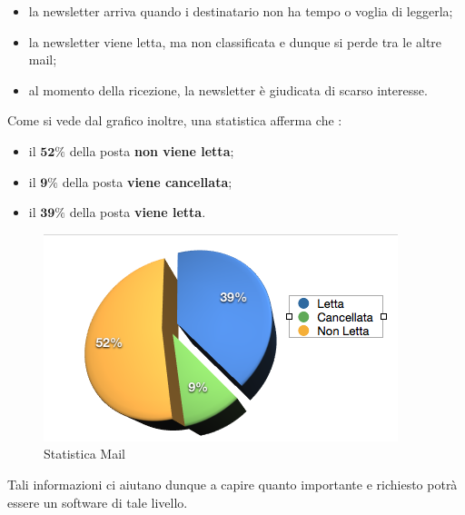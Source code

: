 \begin{itemize}
\item la newsletter arriva quando i destinatario non ha tempo o voglia di leggerla;
\item la newsletter viene letta, ma non classificata e dunque si perde tra le altre mail;
\item al momento della ricezione, la newsletter è giudicata di scarso interesse.
\end{itemize}
Come si vede dal grafico inoltre, una statistica afferma che :
\begin{itemize}
\item il $\textbf{52\%}$ della posta \textbf{non viene letta};
\item il $\textbf{9\%}$ della posta \textbf{viene cancellata};
\item il $\textbf{39\%}$ della posta \textbf{viene letta}.
\end{itemize}
\begin{figure}[H]
\centering
\includegraphics[scale=0.75]{img/statistica.png}
\caption{Statistica Mail}
\label{fig:statistica}
\end{figure}
Tali informazioni ci aiutano dunque a capire quanto importante e richiesto potrà essere un software di tale livello.